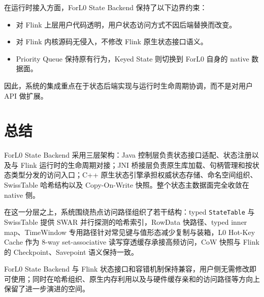 \documentclass[a4paper,11pt]{article}
\newcommand{\project}{ForL0 State Backend}
\begin{document}
在运行时接入方面，\project{} 保持了以下边界约束：

\begin{itemize}
  \item 对 Flink 上层用户代码透明，用户状态访问方式不因后端替换而改变。
  \item 对 Flink 内核源码无侵入，不修改 Flink 原生状态接口语义。
  \item Priority Queue 保持原有行为，Keyed State 则切换到 ForL0 自身的 native 数据面。
\end{itemize}

因此，系统的集成重点在于状态后端实现与运行时生命周期协调，而不是对用户 API 做扩展。

\section{总结}

\project{} 采用三层架构：Java 控制层负责状态接口适配、状态注册以及与 Flink 运行时的生命周期对接；JNI 桥接层负责原生库加载、句柄管理和按状态类型分发的访问入口；C++ 原生状态引擎承担权威状态存储、命名空间组织、SwissTable 哈希结构以及 Copy-On-Write 快照。整个状态主数据面完全收敛在 native 侧。

在这一分层之上，系统围绕热点访问路径组织了若干结构：typed \texttt{StateTable} 与 SwissTable 提供 SWAR 并行探测的哈希索引，RowData 快路径、typed inner map、TimeWindow 专用路径针对常见键与值形态减少复制与装箱，L0 Hot-Key Cache 作为 8-way set-associative 读写穿透缓存承接高频访问，CoW 快照与 Flink 的 Checkpoint、Savepoint 语义保持一致。

\project{} 与 Flink 状态接口和容错机制保持兼容，用户侧无需修改即可使用；同时在哈希组织、原生内存利用以及与硬件缓存亲和的访问路径等方向上保留了进一步演进的空间。
\end{document}
